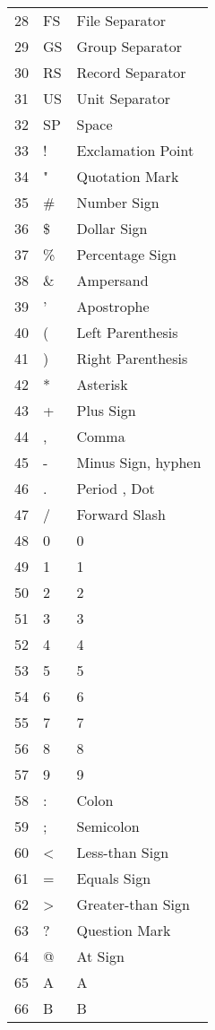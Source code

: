 \begin{description}
\begin{longtable}{lll}
      28 & FS & File Separator \\
      29 & GS & Group Separator \\
      30 & RS & Record Separator \\
      31 & US & Unit Separator \\
      32 & SP & Space \\
      33 & ! & Exclamation Point \\
      34 & " & Quotation Mark \\
      35 & \# & Number Sign \\
      36 & \$ & Dollar Sign \\
      37 & \% & Percentage Sign \\
      38 & \& & Ampersand \\
      39 & ' & Apostrophe \\
      40 & ( & Left Parenthesis \\
      41 & ) & Right Parenthesis \\
      42 & * & Asterisk \\
      43 & + & Plus Sign \\
      44 & , & Comma \\
      45 & - & Minus Sign, hyphen \\
      46 & . & Period , Dot \\
      47 & / & Forward Slash \\
      48 & 0 & 0 \\
      49 & 1 & 1 \\
      50 & 2 & 2 \\
      51 & 3 & 3 \\
      52 & 4 & 4 \\
      53 & 5 & 5 \\
      54 & 6 & 6 \\
      55 & 7 & 7 \\
      56 & 8 & 8 \\
      57 & 9 & 9 \\
      58 & : & Colon \\
      59 & ; & Semicolon  \\
      60 & < & Less-than Sign \\
      61 & = & Equals Sign \\
      62 & > & Greater-than Sign \\
      63 & ? & Question Mark \\
      64 & @ & At Sign \\
      65 & A & A \\
      66 & B & B \\

\end{longtable}
\end{description}
